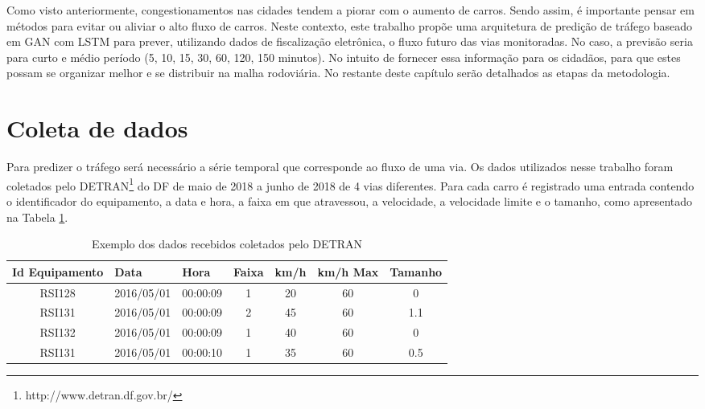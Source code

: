
Como visto anteriormente, congestionamentos nas cidades tendem a piorar com o aumento de carros. Sendo assim, é importante pensar em métodos para evitar ou aliviar o alto fluxo de carros. Neste contexto, este trabalho propõe uma arquitetura de predição de tráfego baseado em \acrshort{GAN} com \acrshort{LSTM} para prever, utilizando dados de fiscalização eletrônica, o fluxo futuro das vias monitoradas. No caso, a previsão seria para curto e médio período (5, 10, 15, 30, 60, 120, 150 minutos). No intuito de fornecer essa informação para os cidadãos, para que estes possam se organizar melhor e se distribuir na malha rodoviária. No restante deste capítulo serão detalhados as etapas da metodologia.

\section{Coleta de dados}
Para predizer o tráfego será necessário a série temporal que corresponde ao fluxo de uma via. Os dados utilizados nesse trabalho foram coletados pelo \acrfull{DETRAN}\footnote{http://www.detran.df.gov.br/} do \acrfull{DF} de maio de 2018 a junho de 2018 de 4 vias diferentes. Para cada carro é registrado uma entrada contendo o identificador do equipamento, a data e hora, a faixa em que atravessou, a velocidade, a velocidade limite e o tamanho, como apresentado na Tabela \ref{table:data}.

\begin{table}[h]
    \begin{tabular}{ccccccc}
    \toprule
    \multicolumn{1}{l}{\textbf{Id Equipamento}} & \multicolumn{1}{l}{\textbf{Data}} & \multicolumn{1}{l}{\textbf{Hora}} & \multicolumn{1}{l}{\textbf{Faixa}} & \multicolumn{1}{l}{\textbf{km/h}} & \multicolumn{1}{l}{\textbf{km/h Max}} & \multicolumn{1}{l}{\textbf{Tamanho}} \\ 
    \midrule
    RSI128 & 2016/05/01 & 00:00:09 & 1 & 20 & 60 & 0 \\
    RSI131 & 2016/05/01 & 00:00:09 & 2 & 45 & 60 & 1.1 \\
    RSI132 & 2016/05/01 & 00:00:09 & 1 & 40 & 60 & 0 \\
    RSI131 & 2016/05/01 & 00:00:10 & 1 & 35 & 60 & 0.5 \\ 
    \bottomrule
    \end{tabular}
    \label{table:data}
    \caption{Exemplo dos dados recebidos coletados pelo \acrshort{DETRAN}}
\end{table}

